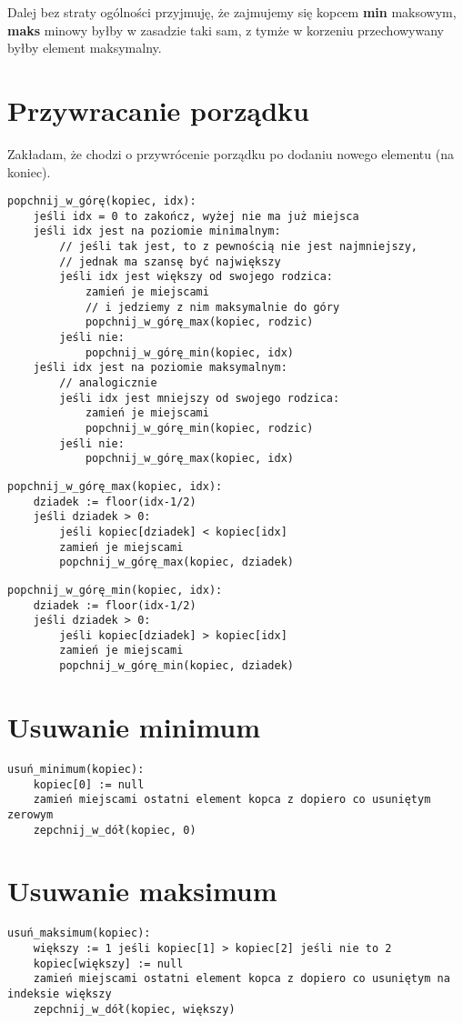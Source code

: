 \documentclass[11pt]{article}
\begin{document}
Dalej bez straty ogólności przyjmuję, że zajmujemy się kopcem \textbf{min} maksowym,
\textbf{maks} minowy byłby w zasadzie taki sam, z tymże w korzeniu przechowywany
byłby element maksymalny.

\section{Przywracanie porządku}
\label{sec:org871680d}
Zakładam, że chodzi o przywrócenie porządku po dodaniu nowego elementu (na koniec).

\begin{verbatim}
popchnij_w_górę(kopiec, idx):
    jeśli idx = 0 to zakończ, wyżej nie ma już miejsca
    jeśli idx jest na poziomie minimalnym:
        // jeśli tak jest, to z pewnością nie jest najmniejszy,
        // jednak ma szansę być największy
        jeśli idx jest większy od swojego rodzica:
            zamień je miejscami
            // i jedziemy z nim maksymalnie do góry
            popchnij_w_górę_max(kopiec, rodzic)
        jeśli nie:
            popchnij_w_górę_min(kopiec, idx)
    jeśli idx jest na poziomie maksymalnym:
        // analogicznie
        jeśli idx jest mniejszy od swojego rodzica:
            zamień je miejscami
            popchnij_w_górę_min(kopiec, rodzic)
        jeśli nie:
            popchnij_w_górę_max(kopiec, idx)
\end{verbatim}

\begin{verbatim}
popchnij_w_górę_max(kopiec, idx):
    dziadek := floor(idx-1/2)
    jeśli dziadek > 0:
        jeśli kopiec[dziadek] < kopiec[idx]
        zamień je miejscami
        popchnij_w_górę_max(kopiec, dziadek)
\end{verbatim}

\begin{verbatim}
popchnij_w_górę_min(kopiec, idx):
    dziadek := floor(idx-1/2)
    jeśli dziadek > 0:
        jeśli kopiec[dziadek] > kopiec[idx]
        zamień je miejscami
        popchnij_w_górę_min(kopiec, dziadek)
\end{verbatim}

\section{Usuwanie minimum}
\label{sec:org1447b6a}

\begin{verbatim}
usuń_minimum(kopiec):
    kopiec[0] := null
    zamień miejscami ostatni element kopca z dopiero co usuniętym zerowym
    zepchnij_w_dół(kopiec, 0)
\end{verbatim}

\section{Usuwanie maksimum}
\label{sec:org7d2b6eb}

\begin{verbatim}
usuń_maksimum(kopiec):
    większy := 1 jeśli kopiec[1] > kopiec[2] jeśli nie to 2
    kopiec[większy] := null
    zamień miejscami ostatni element kopca z dopiero co usuniętym na indeksie większy
    zepchnij_w_dół(kopiec, większy)
\end{verbatim}
\end{document}
